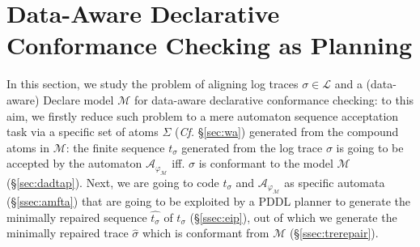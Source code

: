 \section{Data-Aware Declarative Conformance Checking as Planning}\label{sec:dccap}
In this section, we study the problem of aligning log traces $\sigma\in\mathcal{L}$ and a (data-aware) Declare model $\mathcal{M}$ for data-aware declarative conformance checking: to this aim, we firstly reduce such problem to a mere automaton sequence acceptation task via a specific set of atoms $\Sigma$ (\textit{Cf.} \S\ref{sec:wa}) generated from the compound atoms in  $\mathcal{M}$: the finite sequence $t_\sigma$ generated from the log trace $\sigma$ is going to be accepted by the automaton $\mathcal{A}_{\varphi_{\mathcal{M}}}$ iff. $\sigma$ is conformant to the model $\mathcal{M}$ (\S\ref{sec:dadtap}). Next, we are going to code $t_\sigma$ and $\mathcal{A}_{\varphi_{\mathcal{M}}}$ as specific automata (\S\ref{ssec:amfta}) that are going to be exploited by a PDDL planner to generate the minimally repaired sequence $\hat{t_\sigma}$ of $t_\sigma$ (\S\ref{ssec:eip}), out of which we generate the minimally repaired trace $\hat{\sigma}$ which is conformant from $\mathcal{M}$ (\S\ref{ssec:trerepair}).






